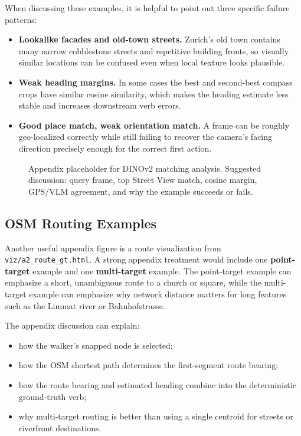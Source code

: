 \documentclass[10pt,twocolumn,letterpaper]{article}
\begin{document}
When discussing these examples, it is helpful to point out three specific failure patterns:
\begin{itemize}
\item \textbf{Lookalike facades and old-town streets.} Zurich's old town contains many narrow cobblestone streets and repetitive building fronts, so visually similar locations can be confused even when local texture looks plausible.
\item \textbf{Weak heading margins.} In some cases the best and second-best compass crops have similar cosine similarity, which makes the heading estimate less stable and increases downstream verb errors.
\item \textbf{Good place match, weak orientation match.} A frame can be roughly geo-localized correctly while still failing to recover the camera's facing direction precisely enough for the correct first action.
\end{itemize}

\begin{figure}[t]
\centering
{}
\caption{Appendix placeholder for DINOv2 matching analysis. Suggested discussion: query frame, top Street View match, cosine margin, GPS/VLM agreement, and why the example succeeds or fails.}
\label{fig:appendix_dino}
\end{figure}

\subsection{OSM Routing Examples}
Another useful appendix figure is a route visualization from \texttt{viz/a2\_route\_gt.html}. A strong appendix treatment would include one \textbf{point-target} example and one \textbf{multi-target} example. The point-target example can emphasize a short, unambiguous route to a church or square, while the multi-target example can emphasize why network distance matters for long features such as the Limmat river or Bahnhofstrasse.

The appendix discussion can explain:
\begin{itemize}
\item how the walker's snapped node is selected;
\item how the OSM shortest path determines the first-segment route bearing;
\item how the route bearing and estimated heading combine into the deterministic ground-truth verb;
\item why multi-target routing is better than using a single centroid for streets or riverfront destinations.
\end{itemize}
\end{document}
